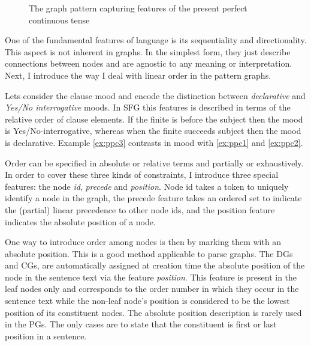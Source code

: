 \begin{figure}[!ht]
    \centering
    \caption{The graph pattern capturing features of the present perfect continuous tense}
    \label{fig:gp1}
\end{figure}

One of the fundamental features of language is its sequentiality and directionality. This aspect is not inherent in graphs. In the simplest form, they just describe connections between nodes and are agnostic to any meaning or interpretation. Next, I introduce the way I deal with linear order in the pattern graphs. 

Lets consider the clause mood and encode the distinction between \textit{declarative} and \textit{Yes/No interrogative} moods. In SFG this features is described in terms of the relative order of clause elements. If the finite is before the subject then the mood is Yes/No-interrogative, whereas when the finite succeeds subject then the mood is declarative. Example \ref{ex:ppc3} contrasts in mood with \ref{ex:ppc1} and \ref{ex:ppc2}. 

Order can be specified in absolute or relative terms and partially or exhaustively. In order to cover these three kinds of constraints, I introduce three special features: the node \textit{id}, \textit{precede} and \textit{position}. Node id takes a token to uniquely identify a node in the graph, the precede feature takes an ordered set to indicate the (partial) linear precedence to other node ids, and the position feature indicates the absolute position of a node.

One way to introduce order among nodes is then by marking them with an absolute position. This is a good method applicable to parse graphs. The DGs and CGs, are automatically assigned at creation time the absolute position of the node in the sentence text via the feature \textit{position}. This feature is present in the leaf nodes only and corresponds to the order number in which they occur in the sentence text while the non-leaf node's position is considered to be the lowest position of its constituent nodes. The absolute position description is rarely used in the PGs. The only cases are to state that the constituent is first or last position in a sentence.  %

